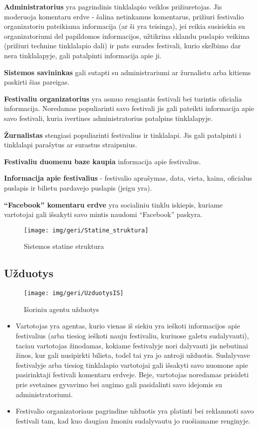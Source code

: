﻿\documentclass{VUMIFPSkursinis}
\begin{document}
{{\textbf{Administratorius} yra pagrindinis tinklalapio veiklos prižiuretojas.
Jis moderuoja komentaru erdve - šalina netinkamus komentarus, prižiuri festivalio organizatoriu pateikiama informacija (ar ši yra teisinga), jei reikia susisiekia su organizatoriumi del papildomos informacijos, užtikrina sklandu puslapio veikima (prižiuri technine tinklalapio dali) ir pats surades festivali, kurio skelbimo dar nera tinklalapyje, gali patalpinti informacija apie ji.

\textbf{Sistemos savininkas} gali sutapti su administrariumi ar žurnalistu arba kitiems paskirti šias pareigas.

\textbf{Festivaliu organizatorius} yra asmuo rengiantis festivali bei turintis oficialia informacija. Noredamas populiarinti savo festivali jis gali pateikti informacija apie savo festivali, kuria ivertines administratorius patalpins tinklalapyje.

\textbf{Žurnalistas} stengiasi populiarinti festivalius ir tinklalapi. Jis gali patalpinti i tinklalapi parašytus ar surastus straipsnius.

\textbf{Festivaliu duomenu baze kaupia} informacija apie festivalius.

\textbf{Informacija apie festivalius} - festivalio aprašymas, data, vieta, kaina, oficialus puslapis ir bilietu pardavejo puslapis (jeigu yra).

\textbf{“Facebook” komentaru erdve} yra socialiniu tinklu iskiepis, kuriame vartotojai gali išsakyti savo mintis naudomi “Facebook” paskyra.

\begin{figure}[H]
    \centering
    \texttt{[image: img/geri/Statine\_struktura]}
    \label{img:uml1}
	\caption{Sistemos statine struktura}
\end{figure}

\subsection {Užduotys}

\begin{figure}[H]
    \centering
    \texttt{[image: img/geri/UzduotysIS]}
    \label{img:uml2}
	\caption{Išoriniu agentu užduotys}
\end{figure}

\begin{itemize}
\item Vartotojas yra agentas, kurio vienas iš siekiu yra ieškoti informacijos apie festivalius (arba tiesiog ieškoti nauju festivaliu, kuriuose galetu sudalyvauti), taciau vartotojas žinodamas, kokiame festivalyje nori dalyvauti jis nebutinai žinos, kur gali nusipirkti bilieta, todel tai yra jo antroji užduotis. Sudalyvave festivalyje arba tiesiog tinklalapio vartotojai gali išsakyti savo nuomone apie pasirinktaji festivali komentaru erdveje. Beje, vartotojas noredamas prisideti prie svetaines gyvavimo bei augimo gali pasidalinti savo idejomis su administratoriumi.
\item Festivalio organizatoriaus pagrindine užduotis yra platinti bei reklamuoti savo festivali tam, kad kuo daugiau žmoniu sudalyvautu jo ruošiamame renginyje.
\end{itemize}

}}
\end{document}
